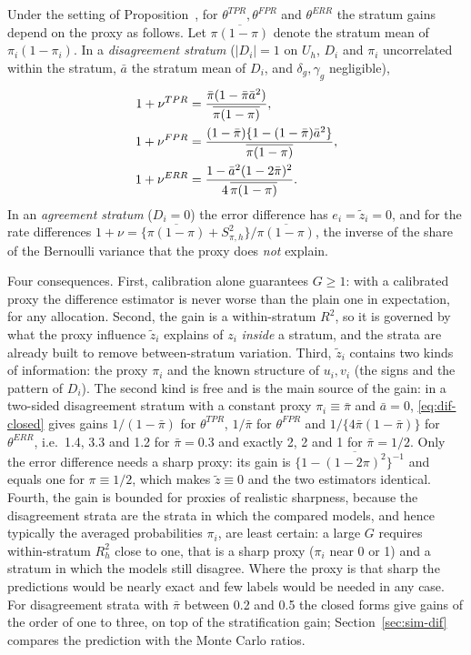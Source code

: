 \begin{proposition}\label{prop:dif-closed}
Under the setting of Proposition~, for $\theta^{TPR},\theta^{FPR}$ and $\theta^{ERR}$ the stratum gains depend on the proxy as follows. Let $\overline{\pi(1-\pi)}$ denote
the stratum mean of $\pi_i(1-\pi_i)$. In a \emph{disagreement stratum} ($|D_i|=1$ on $U_h$, $D_i$ and $\pi_i$ uncorrelated within the stratum,
$\bar a$ the stratum mean of $D_i$, and $\delta_g,\gamma_g$ negligible),
\begin{align}
1+\nu^{TPR}&=\frac{\bar\pi(1-\bar\pi\bar a^2)}{\overline{\pi(1-\pi)}},\notag\\
1+\nu^{FPR}&=\frac{(1-\bar\pi)\{1-(1-\bar\pi)\bar a^2\}}{\overline{\pi(1-\pi)}},\notag\\
1+\nu^{ERR}&=\frac{1-\bar a^2(1-2\bar\pi)^2}{4\,\overline{\pi(1-\pi)}} .\label{eq:dif-closed}
\end{align}
In an \emph{agreement stratum} ($D_i=0$) the error difference has $e_i=\tilde z_i=0$, and for the rate differences
$1+\nu=\{\overline{\pi(1-\pi)}+S^2_{\pi,h}\}/\overline{\pi(1-\pi)}$, the inverse of the share of the Bernoulli variance that the proxy does \emph{not} explain.
\end{proposition}

Four consequences. First, calibration alone guarantees $G\ge1$: with a calibrated proxy the difference estimator is never worse than the plain one in
expectation, for any allocation. Second, the gain is a within-stratum $R^2$, so it is governed by what the proxy influence $\tilde z_i$ explains of $z_i$
\emph{inside} a stratum, and the strata are already built to remove between-stratum variation. Third, $\tilde z_i$ contains two kinds of
information: the proxy $\pi_i$ and the known structure of $u_i,v_i$ (the signs and the pattern of $D_i$). The second kind is free and
is the main source of the gain: in a two-sided disagreement stratum with a constant proxy $\pi_i\equiv\bar\pi$ and $\bar a=0$,
\eqref{eq:dif-closed} gives gains $1/(1-\bar\pi)$ for $\theta^{TPR}$, $1/\bar\pi$ for $\theta^{FPR}$ and $1/\{4\bar\pi(1-\bar\pi)\}$ for $\theta^{ERR}$, i.e.\ 1.4,
3.3 and 1.2 for $\bar\pi=0.3$ and exactly 2, 2 and 1 for $\bar\pi=1/2$. Only the error difference needs a sharp proxy: its gain is
$\{1-\overline{(1-2\pi)^2}\}^{-1}$ and equals one for $\pi\equiv1/2$, which makes $\tilde z\equiv0$ and the two estimators identical. Fourth, the
gain is bounded for proxies of realistic sharpness, because the disagreement strata are the strata in which the compared models, and hence typically the
averaged probabilities $\pi_i$, are least certain: a large $G$ requires within-stratum $R_h^2$ close to one, that is a sharp proxy
($\pi_i$ near 0 or 1) and a stratum in which the models still disagree. Where the proxy is that sharp the predictions would be nearly
exact and few labels would be needed in any case. For disagreement strata with $\bar\pi$ between 0.2 and 0.5 the closed forms give gains of the order of one to three, on top of the
stratification gain; Section~\ref{sec:sim-dif} compares the prediction with the Monte Carlo ratios.

